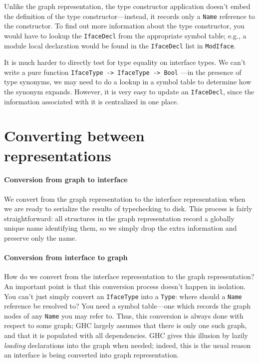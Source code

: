 \noindent
Unlike the graph representation, the type constructor application
doesn't embed the definition of the type constructor---instead,
it records only a \verb|Name| reference to the constructor. To find out
more information about the type constructor, you would have to lookup
the \verb|IfaceDecl| from the appropriate symbol table; e.g., a module
local declaration would be found in the \verb|IfaceDecl| list in
\verb|ModIface|.

It is much harder to directly test for type equality on interface types.
We can't write a pure function \verb|IfaceType -> IfaceType -> Bool|
---in the presence of type synonyms, we may need to do a lookup in
a symbol table to determine how the synonym expands.  However, it is
very easy to update an \verb|IfaceDecl|, since the information
associated with it is centralized in one place.

\section{Converting between representations}
\label{sec:convert}

\paragraph{Conversion from graph to interface}  We convert from
the graph representation to the interface representation when we
are ready to serialize the results of typechecking to disk.
This process is fairly straightforward: all structures in the graph
representation record a globally unique name identifying them,
so we simply drop the extra information and preserve only the name.

\paragraph{Conversion from interface to graph} How do we convert from
the interface representation to the graph representation?  An important
point is that this conversion process doesn't happen in isolation. You
can't just simply convert an
\verb|IfaceType| into a \verb|Type|: where should a
\verb|Name| reference be resolved to?  You need a
symbol table---one which records the graph nodes of any \verb|Name| you
may refer to.  Thus, this conversion is always done with respect to
some graph; GHC largely assumes that there is only one such graph,
and that it is populated with all dependencies. GHC gives this
illusion by lazily \emph{loading} declarations into the graph
when needed; indeed, this is the usual reason an interface is
being converted into graph representation.

